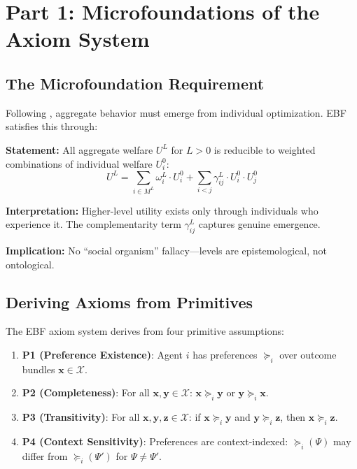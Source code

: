 \section{Part 1: Microfoundations of the Axiom System}
\label{sec:az-micro}

\subsection{The Microfoundation Requirement}

Following \citet{lucas1976econometric}, aggregate behavior must emerge from
individual optimization. EBF satisfies this through:

\begin{tcolorbox}[colback=gray!5!white, colframe=gray!75!black,
    title=Axiom AZ-M1: Methodological Individualism with Levels]
\textbf{Statement:} All aggregate welfare $U^L$ for $L > 0$ is reducible to
weighted combinations of individual welfare $U^0_i$:
\begin{equation}
U^L = \sum_{i \in M^L} \omega^L_i \cdot U^0_i + \sum_{i < j} \gamma^L_{ij} \cdot U^0_i \cdot U^0_j
\end{equation}

\textbf{Interpretation:} Higher-level utility exists only through individuals who
experience it. The complementarity term $\gamma^L_{ij}$ captures genuine emergence.

\textbf{Implication:} No ``social organism'' fallacy---levels are epistemological,
not ontological.
\end{tcolorbox}

\subsection{Deriving Axioms from Primitives}

The EBF axiom system derives from four primitive assumptions:

\begin{enumerate}
\item \textbf{P1 (Preference Existence)}: Agent $i$ has preferences $\succeq_i$
over outcome bundles $\mathbf{x} \in \mathcal{X}$.

\item \textbf{P2 (Completeness)}: For all $\mathbf{x}, \mathbf{y} \in \mathcal{X}$:
$\mathbf{x} \succeq_i \mathbf{y}$ or $\mathbf{y} \succeq_i \mathbf{x}$.

\item \textbf{P3 (Transitivity)}: For all $\mathbf{x}, \mathbf{y}, \mathbf{z} \in \mathcal{X}$:
if $\mathbf{x} \succeq_i \mathbf{y}$ and $\mathbf{y} \succeq_i \mathbf{z}$, then
$\mathbf{x} \succeq_i \mathbf{z}$.

\item \textbf{P4 (Context Sensitivity)}: Preferences are context-indexed:
$\succeq_i(\Psi)$ may differ from $\succeq_i(\Psi')$ for $\Psi \neq \Psi'$.
\end{enumerate}

